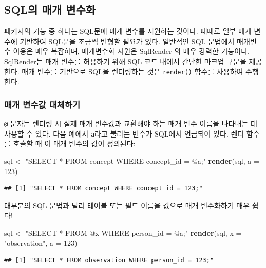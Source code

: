 \documentclass[10.5pt]{book}
\newenvironment{Shaded}{\begin{snugshade}}{\end{snugshade}}
\newcommand{\KeywordTok}[1]{\textcolor[rgb]{0.13,0.29,0.53}{\textbf{#1}}}
\newcommand{\DataTypeTok}[1]{\textcolor[rgb]{0.13,0.29,0.53}{#1}}
\newcommand{\DecValTok}[1]{\textcolor[rgb]{0.00,0.00,0.81}{#1}}
\newcommand{\StringTok}[1]{\textcolor[rgb]{0.31,0.60,0.02}{#1}}
\newcommand{\NormalTok}[1]{#1}
\theoremstyle{definition}
\theoremstyle{definition}
\theoremstyle{definition}
\theoremstyle{remark}
\begin{document}
\subsection{SQL의 매개 변수화}\label{sql--}

패키지의 기능 중 하나는 SQL문에 매개 변수를 지원하는 것이다. 때때로 일부
매개 변수에 기반하여 SQL문을 조금씩 변형할 필요가 있다. 일반적인 SQL
문법에서 매개변수 이용은 매우 복잡하며, 매개변수화 지원은 SqlRender 의
매우 강력한 기능이다. SqlRender는 매개 변수를 허용하기 위해 SQL 코드
내에서 간단한 마크업 구문을 제공한다. 매개 변수를 기반으로 SQL을
렌더링하는 것은 \texttt{render()} 함수를 사용하여 수행한다.

\subsubsection*{매개 변수값 대체하기}\label{--}

\texttt{@} 문자는 렌더링 시 실제 매개 변수값과 교환해야 하는 매개 변수
이름을 나타내는 데 사용할 수 있다. 다음 예에서 \texttt{a}라고 불리는
변수가 SQL에서 언급되어 있다. 렌더 함수를 호출할 때 이 매개 변수의 값이
정의된다:

\begin{Shaded}
\begin{Highlighting}[]
\NormalTok{sql <-}\StringTok{ "SELECT * FROM concept WHERE concept_id = @a;"}
\KeywordTok{render}\NormalTok{(sql, }\DataTypeTok{a =} \DecValTok{123}\NormalTok{)}
\end{Highlighting}
\end{Shaded}

\begin{verbatim}
## [1] "SELECT * FROM concept WHERE concept_id = 123;"
\end{verbatim}

대부분의 SQL 문법과 달리 테이블 또는 필드 이름을 값으로 매개 변수화하기
매우 쉽다!

\begin{Shaded}
\begin{Highlighting}[]
\NormalTok{sql <-}\StringTok{ "SELECT * FROM @x WHERE person_id = @a;"}
\KeywordTok{render}\NormalTok{(sql, }\DataTypeTok{x =} \StringTok{"observation"}\NormalTok{, }\DataTypeTok{a =} \DecValTok{123}\NormalTok{)}
\end{Highlighting}
\end{Shaded}

\begin{verbatim}
## [1] "SELECT * FROM observation WHERE person_id = 123;"
\end{verbatim}
\end{document}
